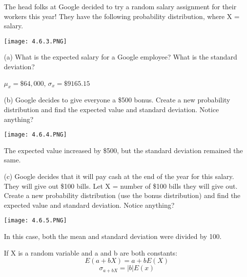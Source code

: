 \documentclass[../stats.tex]{subfiles}
\begin{document}
\begin{example}
    The head folks at Google decided to try a random salary assignment for their workers this year!
    They have the following probability distribution, where X = salary.
    \begin{center}
        \texttt{[image: 4.6.3.PNG]}
    \end{center}

    (a) What is the expected salary for a Google employee? What is the standard deviation?

    $\mu_x=\$64,000$, $\sigma_x = \$9165.15$

    (b) Google decides to give everyone a \$500 bonus. Create a new probability distribution and find the expected value and standard deviation. Notice anything?
    \begin{center}
        \texttt{[image: 4.6.4.PNG]}
    \end{center}
    The expected value increased by \$500, but the standard deviation remained the same.

    (c) Google decides that it will pay cash at the end of the year for this salary. They will give out \$100 bills. Let X = number of \$100 bills they will give out. Create a new 
    probability distribution (use the bonus distribution) and find the expected value and standard deviation. Notice anything?
    \begin{center}
        \texttt{[image: 4.6.5.PNG]}
    \end{center}
    In this case, both the mean and standard deviation were divided by 100.
\end{example}

If X is a random variable and a and b are both constants:
\[ E(a+bX)=a+bE(X)\]
\[ \sigma_{a+bX}=|b|E(x)\]
\end{document}
